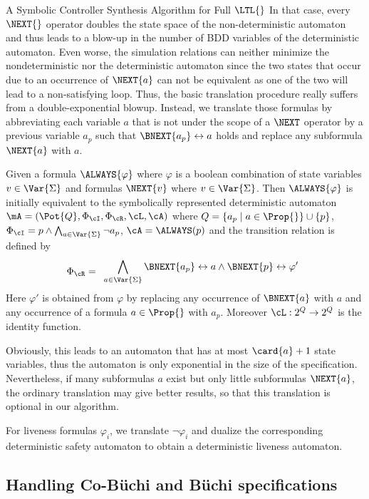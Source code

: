 \documentclass[copyright,creativecommons]{eptcs}
\begin{document}
\begin{section}{A Symbolic Controller Synthesis Algorithm for Full $\LTL{}$}
In that case, every $\NEXT{}$ operator doubles the state space of the non-deterministic automaton and thus leads to a blow-up in the number of BDD variables of the deterministic automaton. Even worse, the simulation relations can neither minimize the nondeterministic nor the deterministic automaton since the two states that occur due to an occurrence of $\NEXT{a}$ can not be equivalent as one of the two will lead to a non-satisfying loop. Thus, the basic translation procedure really suffers from a double-exponential blowup. Instead, we translate those formulas by abbreviating each variable $a$ that is not under the scope of a $\NEXT$ operator by a previous variable $a_{p}$ such that $\BNEXT{a_p} \leftrightarrow a$ holds and replace any subformula $\NEXT{a}$ with $a$.

\begin{proposition}
Given a formula $\ALWAYS{\varphi}$ where $\varphi$ is a boolean combination of state variables $v \in \Var{\Sigma}$ and formulas $\NEXT{v}$ where $v \in \Var{\Sigma}$. Then $\ALWAYS{\varphi}$ is initially equivalent to the symbolically represented deterministic automaton $\mA=(\Pot{Q},\Phi_\cI,\Phi_\cR,\cL,\cA)$ where $Q=\{a_p \mid a \in \Prop{}\} \cup \{p\}$, $\Phi_\cI=p \wedge \bigwedge_{a \in \Var{\Sigma}} \neg a_p$, $\cA=\ALWAYS(p)$ and the transition relation is defined by
\[\Phi_\cR=
  \begin{array}{l}
  \displaystyle{\bigwedge_{a \in \Var{\Sigma}} \BNEXT{a_p} \leftrightarrow a \wedge \BNEXT{p}\leftrightarrow\varphi'}
  \end{array}
\]
Here $\varphi'$ is obtained from $\varphi$ by replacing any occurrence of $\BNEXT{a}$ with $a$ and any occurrence of a formula $a \in \Prop{}$ with $a_p$. Moreover $\cL: 2^Q \rightarrow 2^Q$ is the identity function. \end{proposition}

Obviously, this leads to an automaton that has at most $\card{a}+1$ state variables, thus the automaton is only exponential in the size of the specification. Nevertheless, if many subformulas $a$ exist but only little subformulas $\NEXT{a}$, the ordinary translation may give better results, so that this translation is optional in our algorithm.

For liveness formulas $\varphi_i$, we translate $\neg \varphi_i$ and dualize the corresponding deterministic safety automaton to obtain a deterministic liveness automaton.


\subsection{Handling Co-Büchi and Büchi specifications}


\end{section}
\end{document}
